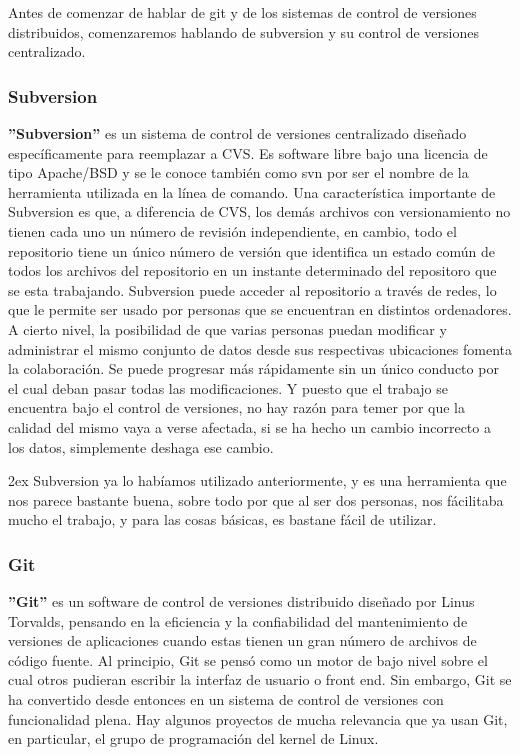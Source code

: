 \documentclass[12pt,a4papert,woside,openright,titlepage,final]{book}
\begin{document}
Antes de comenzar de hablar de git y de los sistemas de control de versiones
distribuidos, comenzaremos hablando de subversion y su control de versiones
centralizado. 

\subsubsection{Subversion}

\textbf{''Subversion''} es un sistema de control de versiones centralizado
diseñado
específicamente para reemplazar a CVS. Es software libre bajo una licencia de
tipo Apache/BSD y se le conoce también como svn por ser el nombre de la
herramienta utilizada en la línea de comando.  Una característica importante de
Subversion es que, a diferencia de CVS, los demás archivos con versionamiento no
tienen cada uno un número de revisión independiente, en cambio, todo el
repositorio tiene un único número de versión que identifica un estado común de
todos los archivos del repositorio en un instante determinado del repositoro que
se esta trabajando. Subversion puede acceder al repositorio a través de redes,
lo que le permite ser usado por personas que se encuentran en distintos
ordenadores. A cierto nivel, la posibilidad de que varias personas puedan
modificar y administrar el mismo conjunto de datos desde sus respectivas
ubicaciones fomenta la colaboración. Se puede progresar más rápidamente sin un
único conducto por el cual deban pasar todas las modificaciones. Y puesto que el
trabajo se encuentra bajo el control de versiones, no hay razón para temer por
que la calidad del mismo vaya a verse afectada, si se ha hecho un cambio
incorrecto a los datos, simplemente deshaga ese cambio. 

\parskip 2ex Subversion ya lo habíamos utilizado anteriormente, y es una
herramienta que nos parece bastante buena, sobre todo por que al ser dos
personas, nos fácilitaba mucho el trabajo, y para las cosas básicas, es bastane
fácil de utilizar. 


\subsubsection{Git}

\textbf{''Git''} es un software de control de versiones distribuido diseñado por
Linus Torvalds, pensando en la eficiencia y la confiabilidad del mantenimiento
de versiones de aplicaciones cuando estas tienen un gran número de archivos de
código fuente. Al principio, Git se pensó como un motor de bajo nivel sobre el
cual otros pudieran escribir la interfaz de usuario o front end. Sin embargo,
Git se ha convertido desde entonces en un sistema de control de versiones con
funcionalidad plena. Hay algunos proyectos de mucha relevancia que ya usan Git,
en particular, el grupo de programación del kernel de Linux. 
\end{document}
